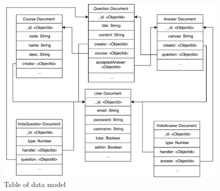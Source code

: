 
\begin{figure}[!htbp]
  \centering
    \includegraphics[width=1\textwidth]{Figures/imp-data-model-table.pdf}
  \caption{Table of data model}
  \label{fig:data-model-table-imp}
\end{figure}
